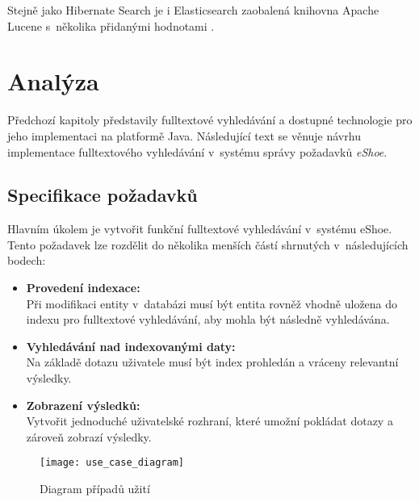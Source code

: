 \documentclass[11pt,oneside]{fithesis2}
\begin{document}
Stejně jako Hibernate Search je i Elasticsearch zaobalená knihovna Apache Lucene s~několika přidanými hodnotami \cite{ElasticsearchDefinitiveGuide}. 

\chapter{Analýza}
\label{Analyza}
Předchozí kapitoly představily fulltextové vyhledávání a dostupné technologie pro jeho implementaci na platformě Java. Následující text se věnuje návrhu implementace fulltextového vyhledávání v~systému správy požadavků \emph{eShoe}. 

\section{Specifikace požadavků}
\label{SpecifikacePozadavku}
Hlavním úkolem je vytvořit funkční fulltextové vyhledávání v~systému eShoe. Tento požadavek lze rozdělit do několika menších částí shrnutých v~následujících bodech:
\begin{itemize}
	\item \textbf{Provedení indexace:} \\ 
		 Při modifikaci entity v~databázi musí být entita rovněž vhodně uložena do indexu pro fulltextové vyhledávání, aby mohla být následně vyhledávána.

	\item \textbf{Vyhledávání nad indexovanými daty:} \\
		Na základě dotazu uživatele musí být index prohledán a vráceny relevantní výsledky.

	\item \textbf{Zobrazení výsledků:} \\
		Vytvořit jednoduché uživatelské rozhraní, které umožní pokládat dotazy a zároveň zobrazí výsledky.		
\end{itemize}

\begin{figure}[h]
	\begin{center}
		\texttt{[image: use\_case\_diagram]}
	\end{center}
	\caption{Diagram případů užití}	
	\label{UseCaseDiagram}
\end{figure}
\end{document}
